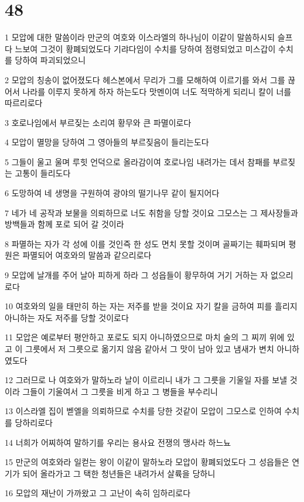 \chapter{48}

\par 1 모압에 대한 말씀이라 만군의 여호와 이스라엘의 하나님이 이같이 말씀하시되 슬프다 느보여 그것이 황폐되었도다 기랴다임이 수치를 당하여 점령되었고 미스갑이 수치를 당하여 파괴되었으니
\par 2 모압의 칭송이 없어졌도다 헤스본에서 무리가 그를 모해하여 이르기를 와서 그를 끊어서 나라를 이루지 못하게 하자 하는도다 맛멘이여 너도 적막하게 되리니 칼이 너를 따르리로다
\par 3 호로나임에서 부르짖는 소리여 황무와 큰 파멸이로다
\par 4 모압이 멸망을 당하여 그 영아들의 부르짖음이 들리는도다
\par 5 그들이 울고 울며 루힛 언덕으로 올라감이여 호로나임 내려가는 데서 참패를 부르짖는 고통이 들리도다
\par 6 도망하여 네 생명을 구원하여 광야의 떨기나무 같이 될지어다
\par 7 네가 네 공작과 보물을 의뢰하므로 너도 취함을 당할 것이요 그모스는 그 제사장들과 방백들과 함께 포로 되어 갈 것이라
\par 8 파멸하는 자가 각 성에 이를 것인즉 한 성도 면치 못할 것이며 골짜기는 훼파되며 평원은 파멸되어 여호와의 말씀과 같으리로다
\par 9 모압에 날개를 주어 날아 피하게 하라 그 성읍들이 황무하여 거기 거하는 자 없으리로다
\par 10 여호와의 일을 태만히 하는 자는 저주를 받을 것이요 자기 칼을 금하여 피를 흘리지 아니하는 자도 저주를 당할 것이로다
\par 11 모압은 예로부터 평안하고 포로도 되지 아니하였으므로 마치 술의 그 찌끼 위에 있고 이 그릇에서 저 그릇으로 옮기지 않음 같아서 그 맛이 남아 있고 냄새가 변치 아니하였도다
\par 12 그러므로 나 여호와가 말하노라 날이 이르리니 내가 그 그릇을 기울일 자를 보낼 것이라 그들이 기울여서 그 그릇을 비게 하고 그 병들을 부수리니
\par 13 이스라엘 집이 벧엘을 의뢰하므로 수치를 당한 것같이 모압이 그모스로 인하여 수치를 당하리로다
\par 14 너희가 어찌하여 말하기를 우리는 용사요 전쟁의 맹사라 하느뇨
\par 15 만군의 여호와라 일컫는 왕이 이같이 말하노라 모압이 황폐되었도다 그 성읍들은 연기가 되어 올라가고 그 택한 청년들은 내려가서 살륙을 당하니
\par 16 모압의 재난이 가까왔고 그 고난이 속히 임하리로다
